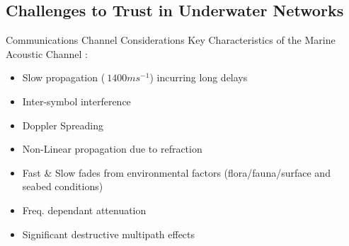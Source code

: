 \documentclass{beamer}
\begin{document}
\subsection{Challenges to Trust in Underwater Networks}

\begin{frame}{Communications Channel Considerations}
  Key Characteristics of the Marine Acoustic Channel \autocite{Urick1983,Partan2006,Stojanovic2007,Stefanov2011}:
  \begin{itemize}
    \item Slow propagation ($~1400ms^{-1}$) incurring long delays
    \item Inter-symbol interference
    \item Doppler Spreading
    \item Non-Linear propagation due to refraction
    \item Fast \& Slow fades from environmental factors (flora/fauna/surface and seabed conditions)
    \item Freq. dependant attenuation
    \item Significant destructive multipath effects
  \end{itemize}
  
\end{frame}
\end{document}
